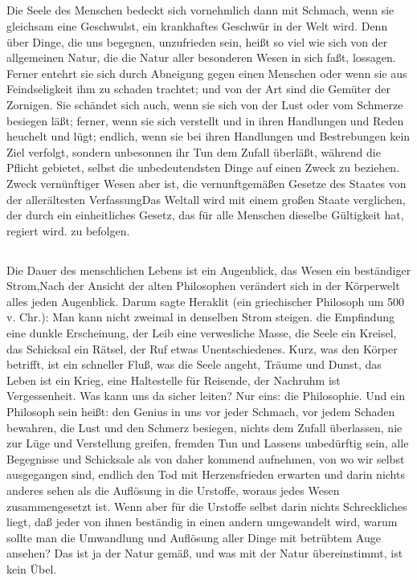 \documentclass[12pt,ngerman,parskip=full]{scrartcl}
\newcounter{abschnitt}
\newcommand{\abschnitt}{\subsection*{\theabschnitt}\stepcounter{abschnitt}}
\begin{document}
\abschnitt

Die Seele des Menschen bedeckt sich vornehmlich dann mit Schmach, wenn sie gleichsam eine Geschwulst, ein krankhaftes Geschwür in der Welt wird. Denn über Dinge, die uns begegnen, unzufrieden sein, heißt so viel wie sich von der allgemeinen Natur, die die Natur aller besonderen Wesen in sich faßt, lossagen. Ferner entehrt sie sich durch Abneigung gegen einen Menschen oder wenn sie aus Feindseligkeit ihm zu schaden trachtet; und von der Art sind die Gemüter der Zornigen. Sie schändet sich auch, wenn sie sich von der Lust oder vom Schmerze besiegen läßt; ferner, wenn sie sich verstellt und in ihren Handlungen und Reden heuchelt und lügt; endlich, wenn sie bei ihren Handlungen und Bestrebungen kein Ziel verfolgt, sondern unbesonnen ihr Tun dem Zufall überläßt, während die Pflicht gebietet, selbst die unbedeutendsten Dinge auf einen Zweck zu beziehen. Zweck vernünftiger Wesen aber ist, die vernunftgemäßen Gesetze des Staates von der allerältesten VerfassungDas Weltall wird mit einem großen Staate verglichen, der durch ein einheitliches Gesetz, das für alle Menschen dieselbe Gültigkeit hat, regiert wird. zu befolgen.

\abschnitt

Die Dauer des menschlichen Lebens ist ein Augenblick, das Wesen ein beständiger Strom,Nach der Ansicht der alten Philosophen verändert sich in der Körperwelt alles jeden Augenblick. Darum sagte Heraklit (ein griechischer Philosoph um 500 v. Chr.): Man kann nicht zweimal in denselben Strom steigen. die Empfindung eine dunkle Erscheinung, der Leib eine verwesliche Masse, die Seele ein Kreisel, das Schicksal ein Rätsel, der Ruf etwas Unentschiedenes. Kurz, was den Körper betrifft, ist ein schneller Fluß, was die Seele angeht, Träume und Dunst, das Leben ist ein Krieg, eine Haltestelle für Reisende, der Nachruhm ist Vergessenheit. Was kann uns da sicher leiten? Nur eins: die Philosophie. Und ein Philosoph sein heißt: den Genius in uns vor jeder Schmach, vor jedem Schaden bewahren, die Lust und den Schmerz besiegen, nichts dem Zufall überlassen, nie zur Lüge und Verstellung greifen, fremden Tun und Lassens unbedürftig sein, alle Begegnisse und Schicksale als von daher kommend aufnehmen, von wo wir selbst ausgegangen sind, endlich den Tod mit Herzensfrieden erwarten und darin nichts anderes sehen als die Auflösung in die Urstoffe, woraus jedes Wesen zusammengesetzt ist. Wenn aber für die Urstoffe selbst darin nichts Schreckliches liegt, daß jeder von ihnen beständig in einen andern umgewandelt wird, warum sollte man die Umwandlung und Auflösung aller Dinge mit betrübtem Auge ansehen? Das ist ja der Natur gemäß, und was mit der Natur übereinstimmt, ist kein Übel.
\end{document}
